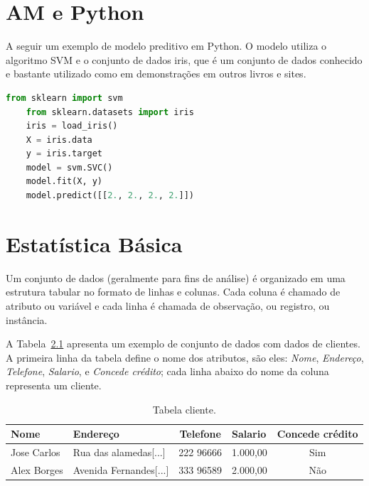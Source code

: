 \chapter{AM e Python}

A seguir um exemplo de modelo preditivo em Python. O modelo utiliza o algoritmo SVM e o conjunto de dados iris, que é um conjunto de dados conhecido e bastante utilizado como em demonstrações em outros livros e sites.

\begin{lstlisting}[language=Python, caption={Exemplo de código que usa AM}]
	from sklearn import svm
	from sklearn.datasets import iris
	iris = load_iris()
	X = iris.data
	y = iris.target
	model = svm.SVC()
	model.fit(X, y)
	model.predict([[2., 2., 2., 2.]])
\end{lstlisting}

\chapter{Estatística Básica}

Um conjunto de dados (geralmente para fins de análise) é organizado em uma estrutura tabular no formato de linhas e colunas. Cada coluna é chamado de atributo ou variável e cada linha é chamada de observação, ou registro, ou instância.

A Tabela~\ref{tbl:cliente} apresenta um exemplo de conjunto de dados com dados de clientes. A primeira linha da tabela define o nome dos atributos, são eles: \textit{Nome}, \textit{Endereço}, \textit{Telefone}, \textit{Salario}, e \textit{Concede crédito}; cada linha abaixo do nome da coluna representa um cliente. %

\begin{table}
	\centering
	\caption{Tabela cliente.}
	\begin{tabular}{|l|l|c|l|c|}
	\hline
	\textbf{Nome} & \textbf{Endereço} & \textbf{Telefone} & \textbf{Salario} & \textbf{Concede crédito}\\
	\hline
	Jose Carlos & Rua das alamedas[...] & 222 96666 & 1.000,00 & Sim \\
	\hline
	Alex Borges & Avenida Fernandes[...]& 333 96589 & 2.000,00 & Não\\
	\hline
	\end{tabular}
	\label{tbl:cliente}
\end{table}

